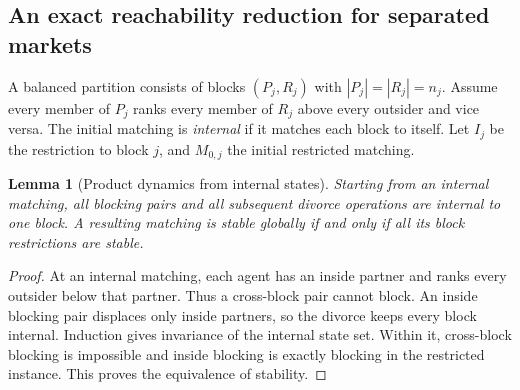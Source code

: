 \documentclass[11pt,a4paper]{article}
\newtheorem{lemma}[theorem]{Lemma}
\begin{document}
\subsection*{An exact reachability reduction for separated markets}
A balanced partition consists of blocks $(P_j,R_j)$ with $|P_j|=|R_j|=n_j$. Assume every member of $P_j$ ranks every member of $R_j$ above every outsider and vice versa. The initial matching is \emph{internal} if it matches each block to itself. Let $I_j$ be the restriction to block $j$, and $M_{0,j}$ the initial restricted matching.

\begin{lemma}[Product dynamics from internal states]
Starting from an internal matching, all blocking pairs and all subsequent divorce operations are internal to one block. A resulting matching is stable globally if and only if all its block restrictions are stable.
\end{lemma}
\begin{proof}
At an internal matching, each agent has an inside partner and ranks every outsider below that partner. Thus a cross-block pair cannot block. An inside blocking pair displaces only inside partners, so the divorce keeps every block internal. Induction gives invariance of the internal state set. Within it, cross-block blocking is impossible and inside blocking is exactly blocking in the restricted instance. This proves the equivalence of stability.
\end{proof}
\end{document}
